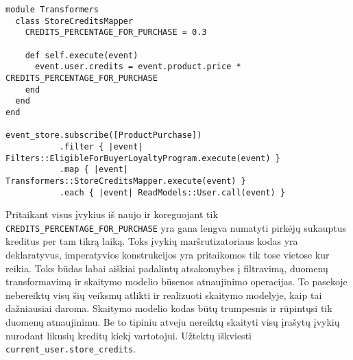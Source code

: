 \begin{lstlisting}[]
module Transformers
  class StoreCreditsMapper
    CREDITS_PERCENTAGE_FOR_PURCHASE = 0.3

    def self.execute(event)
      event.user.credits = event.product.price * CREDITS_PERCENTAGE_FOR_PURCHASE
    end
  end
end

event_store.subscribe([ProductPurchase])
           .filter { |event| Filters::EligibleForBuyerLoyaltyProgram.execute(event) }
           .map { |event| Transformers::StoreCreditsMapper.execute(event) }
           .each { |event| ReadModels::User.call(event) }
\end{lstlisting}

Pritaikant visus įvykius iš naujo ir koreguojant tik \lstinline|CREDITS_PERCENTAGE_FOR_PURCHASE| yra gana lengva numatyti pirkėjų sukauptus kreditus per tam tikrą laiką. Toks įvykių maršrutizatoriaus kodas yra deklaratyvus, imperatyvios konstrukcijos yra pritaikomos tik tose vietose kur reikia. Toks būdas labai aiškiai padalintų atsakomybes į filtravimą, duomenų transformavimą ir skaitymo modelio būsenos atnaujinimo operacijas. To pasekoje nebereiktų visų šių veiksmų atlikti ir realizuoti skaitymo modelyje, kaip tai dažniausiai daroma. Skaitymo modelio kodas būtų trumpesnis ir rūpintųsi tik duomenų atnaujinimu. Be to tipiniu atveju nereiktų skaityti visų įrašytų įvykių nurodant likusių kreditų kiekį vartotojui. Užtektų iškviesti \lstinline|current_user.store_credits|.






